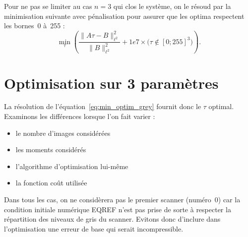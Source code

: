 \documentclass[main.tex]{subfiles}
\begin{document}
Pour ne pas se limiter au cas $n=3$ qui clos le système, on le résoud par la minimisation suivante avec pénalisation pour assurer que les optima  respectent les bornes~0 à~255 :
\begin{equation}\label{eq:min_optim_grey}
\min_{\tau} \left( \dfrac{\| A\tau - B \|^2_{\ell^2}}{\|B\|^2_{\ell^2}} + 1e7 
\times \big( \tau \notin  [0;255]^3 \big) \right).
\end{equation}

\section{Optimisation sur 3 paramètres}
La résolution de l'équation~\eqref{eq:min_optim_grey} fournit donc le $\tau$ optimal. Examinons les différences lorsque l'on fait varier :
\begin{itemize}
\item le nombre d'images considérées
\item les moments considérés
\item l'algorithme d'optimisation lui-même
\item la fonction coût utilisée
\end{itemize}

Dans tous les cas, on ne considèrera pas le premier scanner (numéro~0) car la condition initiale numérique EQREF  n'est pas prise de sorte à respecter la répartition des niveaux de gris du scanner. Evitons donc d'inclure dans l'optimisation une erreur de base qui serait incompressible.
\end{document}
